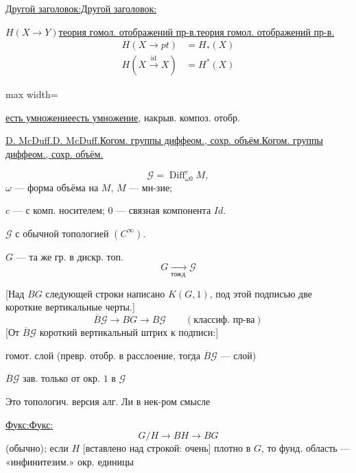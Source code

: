 \documentclass[11pt]{article}
\theoremstyle{definition}
\theoremstyle{remark}
\let\DiplomaticMathUnderline\underline
\renewcommand{\underline}[1]{\ifmmode\DiplomaticMathUnderline{#1}\else\uline{#1}\fi}
\begin{document}
\underline{Другой заголовок:}

$H(X\longrightarrow Y)$\qquad \underline{теория гомол. отображений пр-в.}
\begin{align*}
H(X\longrightarrow pt)&=H_*(X)\\
H(X\overset{\mathrm{id}}{\longrightarrow}X)&=H^*(X)
\end{align*}

\begin{center}
\begin{adjustbox}{max width=\linewidth}
\end{adjustbox}
\end{center}
\underline{есть умножение}, накрыв. композ. отобр.

\underline{D. McDuff.}\qquad \underline{Когом. группы диффеом., сохр. объём.}

\begin{equation*}
\mathcal G=\operatorname{Diff}_{\omega 0}^{c}M,
\end{equation*}
$\omega$ — форма объёма на $M$, $M$ — мн-зие;

$c$ — с комп. носителем; $0$ — связная компонента $Id$.

$\mathcal G$ с обычной топологией $(C^\infty)$.

$G$ — та же гр. в дискр. топ.
\begin{equation*}
G\underset{\text{тожд.}}{\longrightarrow}\mathcal G
\end{equation*}

[Над $BG$ следующей строки написано $K(G,1)$, под этой подписью две короткие вертикальные черты.]
\begin{equation*}
\overline B\mathcal G\longrightarrow BG\longrightarrow B\mathcal G
\qquad (\text{классиф. пр-ва})
\end{equation*}
[От $\overline B\mathcal G$ короткий вертикальный штрих к подписи:]

гомот. слой (превр. отобр. в расслоение, тогда $\overline B\mathcal G$ — слой)

$\overline B\mathcal G$ зав. только от окр. $1$ в $\mathcal G$

Это топологич. версия алг. Ли в нек-ром смысле

\underline{Фукс:}
\begin{equation*}
G/H\longrightarrow BH\longrightarrow BG
\end{equation*}
(обычно); если $H$ [вставлено над строкой: очень] плотно в $G$,
то фунд. область — «инфинитезим.» окр. единицы
\end{document}
